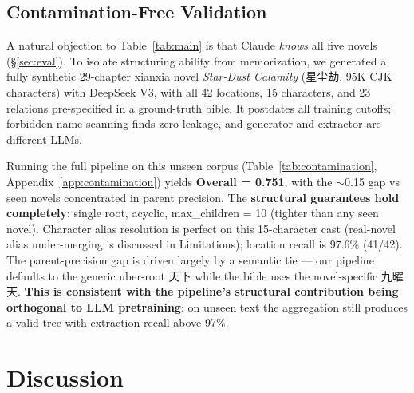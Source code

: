 \documentclass[11pt]{article}
\newenvironment{CJK}[2]{}{}
\begin{document}
\subsection{Contamination-Free Validation}
\label{sec:contamination-free}

A natural objection to Table~\ref{tab:main} is that Claude \emph{knows} all five novels (\S\ref{sec:eval}). To isolate structuring ability from memorization, we generated a fully synthetic 29-chapter xianxia novel \textit{Star-Dust Calamity} (\begin{CJK}{UTF8}{gbsn}星尘劫\end{CJK}, 95K CJK characters) with DeepSeek V3, with all 42 locations, 15 characters, and 23 relations pre-specified in a ground-truth bible. It postdates all training cutoffs; forbidden-name scanning finds zero leakage, and generator and extractor are different LLMs.

Running the full pipeline on this unseen corpus (Table~\ref{tab:contamination}, Appendix~\ref{app:contamination}) yields \textbf{Overall = 0.751}, with the $\sim$0.15 gap vs seen novels concentrated in parent precision. The \textbf{structural guarantees hold completely}: single root, acyclic, max\_children = 10 (tighter than any seen novel). Character alias resolution is perfect on this 15-character cast (real-novel alias under-merging is discussed in Limitations); location recall is 97.6\% (41/42). The parent-precision gap is driven largely by a semantic tie --- our pipeline defaults to the generic uber-root \begin{CJK}{UTF8}{gbsn}天下\end{CJK} while the bible uses the novel-specific \begin{CJK}{UTF8}{gbsn}九曜天\end{CJK}. \textbf{This is consistent with the pipeline's structural contribution being orthogonal to LLM pretraining}: on unseen text the aggregation still produces a valid tree with extraction recall above 97\%.

\section{Discussion}
\label{sec:discussion}
\end{document}
